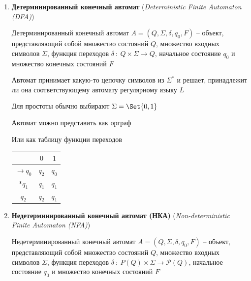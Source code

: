 \documentclass[12pt]{article}
\begin{document}
    \begin{enumerate}
        \item \textbf{Детерминированный конечный автомат} (\textit{Deterministic Finite Automaton (DFA)})

        Детерминированный конечный автомат $A = (Q, \Sigma, \delta, q_0, F)$ -- объект, представляющий собой множество состояний $Q$, множество входных символов $\Sigma$,
        функция переходов $\delta \ : \ Q \times \Sigma \to Q$, начальное состояние $q_0$ и множество конечных состояний $F$

        Автомат принимает какую-то цепочку символов из $\Sigma^*$ и решает, принадлежит ли она соответствующему автомату регулярному языку $L$

        Для простоты обычно выбирают $\Sigma = \Set{0, 1}$

        Автомат можно представить как орграф


        Или как таблицу функции переходов

        \begin{tabular}{c|cc}
            & $0$   & $1$   \\
            \hline
            $\to q_0$ & $q_2$ & $q_0$ \\
            \hline
            $*q_1$    & $q_1$ & $q_1$ \\
            \hline
            $q_2$     & $q_2$ & $q_1$
        \end{tabular}

        \item \textbf{Недетерминированный конечный автомат (НКА)} (\textit{Non-deterministic Finite Automaton (NFA)})

        Недетерминированный конечный автомат $A = (Q, \Sigma, \delta, q_0, F)$ -- объект, представляющий собой множество состояний $Q$, множество входных символов $\Sigma$,
        функция переходов $\delta \ : \ P(Q) \times \Sigma \to \mathcal{P}(Q)$, начальное состояние $q_0$ и множество конечных состояний $F$


\end{enumerate}
\end{document}
